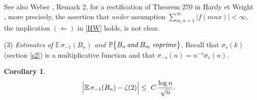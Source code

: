 \documentclass[11pt,draft,reqno]{amsart}
\newtheorem{corollary}[theorem]{Corollary}
\theoremstyle{definition}
\theoremstyle{remarks}
\numberwithin{equation}{section}
\def \s{{\sigma}}
\def \noi{{\noindent}}
\def\P{{\mathcal P}}
\def\E{{\mathbb E \,}}
\def\P{{\mathbb P}}
\def\R{{\mathbb R}}
\begin{document}
See also Weber \cite{W13}, Remark 2,  for a rectification  of  Theorem 270 in Hardy et   Wright \cite{HW}, more precisely, the assertion that {\it under} assumption $ {\sum_{m,n=1}^\infty} |f(mnx)|<\infty$,     the implication    $(\Longleftarrow)$  in \eqref{HW} holds,     is not clear.\medskip \par \noi
(3) {\it Estimates of $\E \s_{-1}(B_n)$ and $\P\big\{  B_n\,{\it and}\, B_m \ {\it coprime} \big\}$.}
    Recall that $\s_s(k)$ (section \ref{s2})  
is a multiplicative function and  that $\s_{-s}(n)=n^{-s} \s_s(n)  $. \begin{corollary}
$$\Big|\E \s_{-1}(B_n)-   \zeta(2) \Big| \le\  C\,{  \log n\over\sqrt n} .$$
\end{corollary}



 
\end{document}
